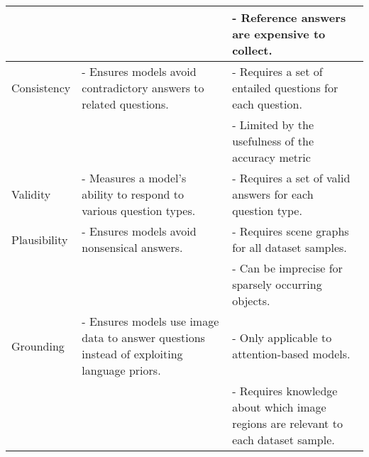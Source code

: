\begin{table}[htbp]
\begin{footnotesize}
\begin{tabularx}{\linewidth}{@{}lLL@{}}
                                                &                                                                                            & - Reference answers are expensive to collect.                                                                                                                           \\ \midrule
            Consistency                         & - Ensures models avoid contradictory answers to related questions.                         & - Requires a set of entailed questions for each question.                                                                                                               \\
                                                &                                                                                            & - Limited by the usefulness of the accuracy metric                                                                                                                      \\ \midrule
            Validity                            & - Measures a model's ability to respond to various question types.                         & - Requires a set of valid answers for each question type.                                                                                                               \\ \midrule
            Plausibility                        & - Ensures models avoid nonsensical answers.                                                & - Requires scene graphs for all dataset samples.                                                                                                                        \\
                                                &                                                                                            & - Can be imprecise for sparsely occurring objects.                                                                                                                      \\ \midrule
            Grounding                           & - Ensures models use image data to answer questions instead of exploiting language priors. & - Only applicable to attention-based models.                                                                                                                            \\
                                                &                                                                                            & - Requires knowledge about which image regions are relevant to each dataset sample.                                                                                     \\ \midrule

\end{tabularx}
\end{footnotesize}
\end{table}
